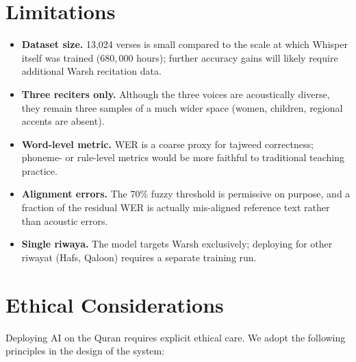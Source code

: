 \section{Limitations}

\begin{warnbox}[title=Known limitations]
\begin{itemize}
  \item \textbf{Dataset size.} 13{,}024 verses is small compared to the
        scale at which Whisper itself was trained ($680{,}000$ hours);
        further accuracy gains will likely require additional Warsh
        recitation data.
  \item \textbf{Three reciters only.} Although the three voices are
        acoustically diverse, they remain three samples of a much wider
        space (women, children, regional accents are absent).
  \item \textbf{Word-level metric.} WER is a coarse proxy for tajweed
        correctness; phoneme- or rule-level metrics would be more
        faithful to traditional teaching practice.
  \item \textbf{Alignment errors.} The 70\% fuzzy threshold is
        permissive on purpose, and a fraction of the residual WER is
        actually mis-aligned reference text rather than acoustic
        errors.
  \item \textbf{Single riwaya.} The model targets Warsh exclusively;
        deploying for other riwayat (Hafs, Qaloon) requires a separate
        training run.
\end{itemize}
\end{warnbox}

\section{Ethical Considerations}

Deploying AI on the Quran requires explicit ethical care. We adopt the
following principles in the design of the system:

